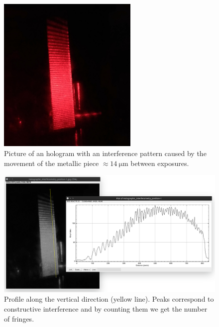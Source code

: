 \documentclass[11pt,a4paper]{article}
\begin{document}
\begin{figure}[ht]
\centering
\includegraphics[width=0.6\textwidth]{Holographic_interferometry_position}
\caption{Picture of an hologram with an interference pattern caused by the movement of the metallic piece $\approx\SI{14}{\micro \m}$ between exposures.}
\label{fig:holographic_interferometry_position}
\end{figure}

\begin{figure}[ht]
\centering
\includegraphics[width=\textwidth]{Holographic_interferometry_position_fringes}
\caption{Profile along the vertical direction (yellow line). Peaks correspond to constructive interference and by counting them we get the number of fringes.}
\label{fig:holographic_interferometry_position_fringes}
\end{figure}
\end{document}

